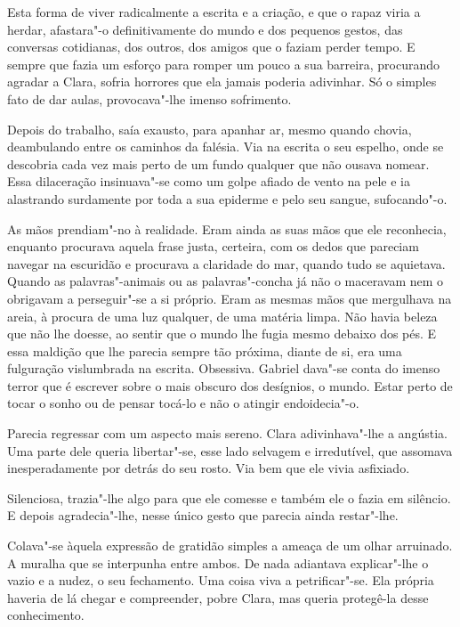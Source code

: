 Esta forma de viver radicalmente a escrita e a criação, e que o rapaz
viria a herdar, afastara"-o definitivamente do mundo e dos pequenos
gestos, das conversas cotidianas, dos outros, dos amigos que o faziam
perder tempo. E sempre que fazia um esforço para romper um pouco a sua
barreira, procurando agradar a Clara, sofria horrores que ela jamais
poderia adivinhar. Só o simples fato de dar aulas, provocava"-lhe imenso
sofrimento.

Depois do trabalho, saía exausto, para apanhar ar, mesmo quando chovia,
deambulando entre os caminhos da falésia. Via na escrita o seu espelho,
onde se descobria cada vez mais perto de um fundo qualquer que não
ousava nomear. Essa dilaceração insinuava"-se como um golpe afiado de
vento na pele e ia alastrando surdamente por toda a sua epiderme e pelo
seu sangue, sufocando"-o.

As mãos prendiam"-no à realidade. Eram ainda as suas mãos que ele
reconhecia, enquanto procurava aquela frase justa, certeira, com os
dedos que pareciam navegar na escuridão e procurava a claridade do mar,
quando tudo se aquietava. Quando as palavras"-animais ou as
palavras"-concha já não o maceravam nem o obrigavam a perseguir"-se a si
próprio. Eram as mesmas mãos que mergulhava na areia, à procura de uma
luz qualquer, de uma matéria limpa. Não havia beleza que não lhe doesse,
ao sentir que o mundo lhe fugia mesmo debaixo dos pés. E essa maldição
que lhe parecia sempre tão próxima, diante de si, era uma fulguração
vislumbrada na escrita. Obsessiva. Gabriel dava"-se conta do imenso
terror que é escrever sobre o mais obscuro dos desígnios, o mundo. Estar
perto de tocar o sonho ou de pensar tocá-lo e não o atingir
endoidecia"-o.

Parecia regressar com um aspecto mais sereno. Clara adivinhava"-lhe a
angústia. Uma parte dele queria libertar"-se, esse lado selvagem e
irredutível, que assomava inesperadamente por detrás do seu rosto. Via
bem que ele vivia asfixiado.

Silenciosa, trazia"-lhe algo para que ele comesse e também ele o fazia em
silêncio. E depois agradecia"-lhe, nesse único gesto que parecia ainda
restar"-lhe.

Colava"-se àquela expressão de gratidão simples a ameaça de um olhar
arruinado. A muralha que se interpunha entre ambos. De nada adiantava
explicar"-lhe o vazio e a nudez, o seu fechamento. Uma coisa viva a
petrificar"-se. Ela própria haveria de lá chegar e compreender, pobre
Clara, mas queria protegê-la desse conhecimento.

